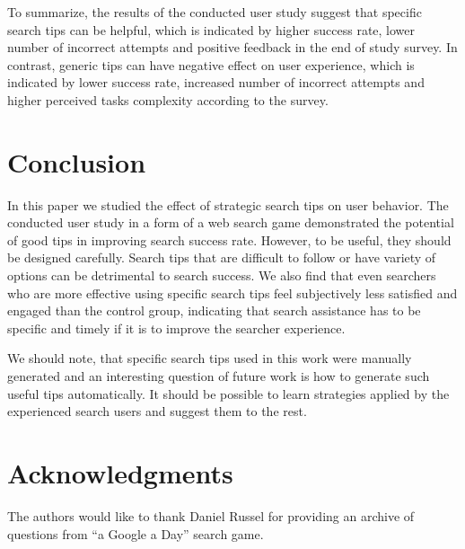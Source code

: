 \documentclass{sig-alternate}
\begin{document}
To summarize, the results of the conducted user study suggest that specific search tips can be helpful, which is indicated by higher success rate, lower number of incorrect attempts and positive feedback in the end of study survey.
In contrast, generic tips can have negative effect on user experience, which is indicated by lower success rate, increased number of incorrect attempts and higher perceived tasks complexity according to the survey.

\section{Conclusion}
In this paper we studied the effect of strategic search tips on user behavior. 
The conducted user study in a form of a web search game demonstrated the potential of good tips in improving search success rate.
However, to be useful, they should be designed carefully.
Search tips that are difficult to follow or have variety of options can be detrimental to search success.
We also find that even searchers who are more effective using specific search tips feel subjectively less satisfied and engaged than the control group, indicating that search assistance has to be specific and timely if it is to improve the searcher experience.

We should note, that specific search tips used in this work were manually generated and an interesting question of future work is how to generate such useful tips automatically.
It should be possible to learn strategies applied by the experienced search users and suggest them to the rest.


\section{Acknowledgments}
The authors would like to thank Daniel Russel for providing an archive of questions from ``a Google a Day'' search game.

%

%
%
\end{document}
